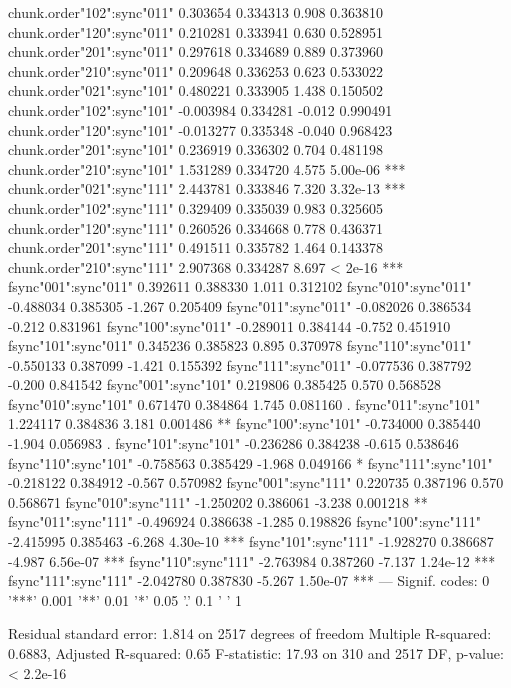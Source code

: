 \documentclass[11pt]{article}
\begin{document}
\begin{Schunk}
\begin{Soutput}
chunk.order"102":sync"011"      0.303654   0.334313   0.908 0.363810    
chunk.order"120":sync"011"      0.210281   0.333941   0.630 0.528951    
chunk.order"201":sync"011"      0.297618   0.334689   0.889 0.373960    
chunk.order"210":sync"011"      0.209648   0.336253   0.623 0.533022    
chunk.order"021":sync"101"      0.480221   0.333905   1.438 0.150502    
chunk.order"102":sync"101"     -0.003984   0.334281  -0.012 0.990491    
chunk.order"120":sync"101"     -0.013277   0.335348  -0.040 0.968423    
chunk.order"201":sync"101"      0.236919   0.336302   0.704 0.481198    
chunk.order"210":sync"101"      1.531289   0.334720   4.575 5.00e-06 ***
chunk.order"021":sync"111"      2.443781   0.333846   7.320 3.32e-13 ***
chunk.order"102":sync"111"      0.329409   0.335039   0.983 0.325605    
chunk.order"120":sync"111"      0.260526   0.334668   0.778 0.436371    
chunk.order"201":sync"111"      0.491511   0.335782   1.464 0.143378    
chunk.order"210":sync"111"      2.907368   0.334287   8.697  < 2e-16 ***
fsync"001":sync"011"            0.392611   0.388330   1.011 0.312102    
fsync"010":sync"011"           -0.488034   0.385305  -1.267 0.205409    
fsync"011":sync"011"           -0.082026   0.386534  -0.212 0.831961    
fsync"100":sync"011"           -0.289011   0.384144  -0.752 0.451910    
fsync"101":sync"011"            0.345236   0.385823   0.895 0.370978    
fsync"110":sync"011"           -0.550133   0.387099  -1.421 0.155392    
fsync"111":sync"011"           -0.077536   0.387792  -0.200 0.841542    
fsync"001":sync"101"            0.219806   0.385425   0.570 0.568528    
fsync"010":sync"101"            0.671470   0.384864   1.745 0.081160 .  
fsync"011":sync"101"            1.224117   0.384836   3.181 0.001486 ** 
fsync"100":sync"101"           -0.734000   0.385440  -1.904 0.056983 .  
fsync"101":sync"101"           -0.236286   0.384238  -0.615 0.538646    
fsync"110":sync"101"           -0.758563   0.385429  -1.968 0.049166 *  
fsync"111":sync"101"           -0.218122   0.384912  -0.567 0.570982    
fsync"001":sync"111"            0.220735   0.387196   0.570 0.568671    
fsync"010":sync"111"           -1.250202   0.386061  -3.238 0.001218 ** 
fsync"011":sync"111"           -0.496924   0.386638  -1.285 0.198826    
fsync"100":sync"111"           -2.415995   0.385463  -6.268 4.30e-10 ***
fsync"101":sync"111"           -1.928270   0.386687  -4.987 6.56e-07 ***
fsync"110":sync"111"           -2.763984   0.387260  -7.137 1.24e-12 ***
fsync"111":sync"111"           -2.042780   0.387830  -5.267 1.50e-07 ***
---
Signif. codes:  0 '***' 0.001 '**' 0.01 '*' 0.05 '.' 0.1 ' ' 1

Residual standard error: 1.814 on 2517 degrees of freedom
Multiple R-squared:  0.6883,	Adjusted R-squared:   0.65 
F-statistic: 17.93 on 310 and 2517 DF,  p-value: < 2.2e-16
\end{Soutput}
\end{Schunk}
\end{document}
